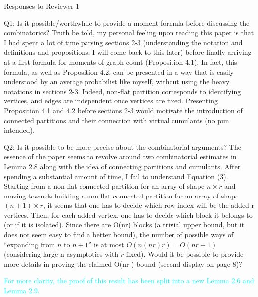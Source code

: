 \documentclass[11pt]{article}
\begin{document}
\pagestyle{empty} 

\begin{center} 
\large{Responses to Reviewer 1} %
\\ 
\end{center}

\noindent 

\noindent
\begin{description}
\item 
Q1: Is it possible/worthwhile to provide a moment formula before discussing
the combinatorics?
Truth be told, my personal feeling upon reading this paper is that I had spent
a lot of time parsing sections 2-3 (understanding the notation and definitions
and propositions; I will come back to this later) before finally arriving at a first formula for moments of graph count (Proposition 4.1). In fact, this formula, as
well as Proposition 4.2, can be presented in a way that is easily understood by
an average probabilist like myself, without using the heavy notations in sections
2-3. Indeed, non-flat partition corresponds to identifying vertices, and edges are
independent once vertices are fixed. Presenting Proposition 4.1 and 4.2 before
sections 2-3 would motivate the introduction of connected partitions and their
connection with virtual cumulants (no pun intended).
\item
  Q2: Is it possible to be more precise about the combinatorial arguments?
The essence of the paper seems to revolve around two combinatorial estimates in Lemma 2.8 along with the idea of connecting partitions and cumulants.
After spending a substantial amount of time, I fail to understand Equation (3).
Starting from a non-flat connected partition for an array of shape $n \times r$
and
moving towards building a non-flat connected partition for an array of shape
$(n + 1) \times r$, it seems that one has to decide which row index will be the added r vertices. Then, for each added vertex, one has to decide which block it belongs
to (or if it is isolated). Since there are O(nr) blocks (a trivial upper bound, but
it does not seem easy to find a better bound), the number of possible ways of
``expanding from $n$ to $n + 1$'' is at most $O(n(nr)r ) = O(nr+1 )$
(considering large
n asymptotics with $r$ fixed). Would it be possible to provide more details in
proving the claimed O(nr ) bound (second display on page 8)?

\textcolor{cyan}{For more clarity, the proof of this result has been split into a new Lemma 2.6 and Lemma 2.9.}
\end{description} 
\end{document}
